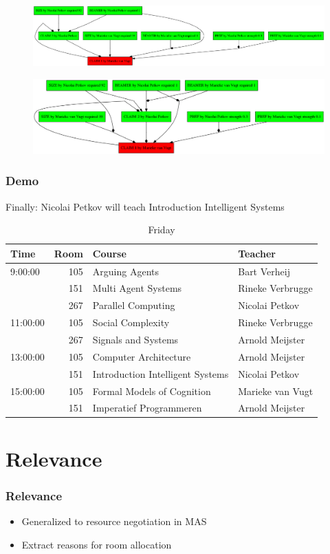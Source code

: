 \documentclass{beamer}
\begin{document}
\begin{frame}[plain]
	\begin{figure}
		\includegraphics[keepaspectratio,width=\textwidth,height=\textheight,]{demo/3}
	\end{figure}
\end{frame}

\begin{frame}[plain]
	\begin{figure}
		\includegraphics[keepaspectratio,width=\textwidth,height=\textheight,]{demo/4}
	\end{figure}
\end{frame}

\begin{frame}
	\frametitle{Demo}
	Finally: Nicolai Petkov will teach Introduction Intelligent Systems
	\fontsize{6}{7.2}\selectfont
	\begin{table}
		\centering
		\caption{Friday}
		\begin{tabular}{l|r|l|l}
			Time & Room & Course & Teacher \\ \hline
			\hline
			9:00:00 & 105 & Arguing Agents & Bart Verheij\\
			& 151 & Multi Agent Systems & Rineke Verbrugge\\
			& 267 & Parallel Computing & Nicolai Petkov\\\hline
			11:00:00 & 105 & Social Complexity & Rineke Verbrugge\\
			& 267 & Signals and Systems & Arnold Meijster\\\hline
			13:00:00 & 105 & Computer Architecture & Arnold Meijster\\
			& 151 & Introduction Intelligent Systems & Nicolai Petkov\\\hline
			15:00:00 & 105 & Formal Models of Cognition & Marieke van Vugt\\
			& 151 & Imperatief Programmeren & Arnold Meijster\\
			\end{tabular}
	\end{table}
\end{frame}

\section{Relevance}
\begin{frame}
	\frametitle{Relevance}
        \begin{itemize}[<+->]
            \item Generalized to resource negotiation in MAS
            \item Extract reasons for room allocation
        \end{itemize}
\end{frame}

\end{document}
